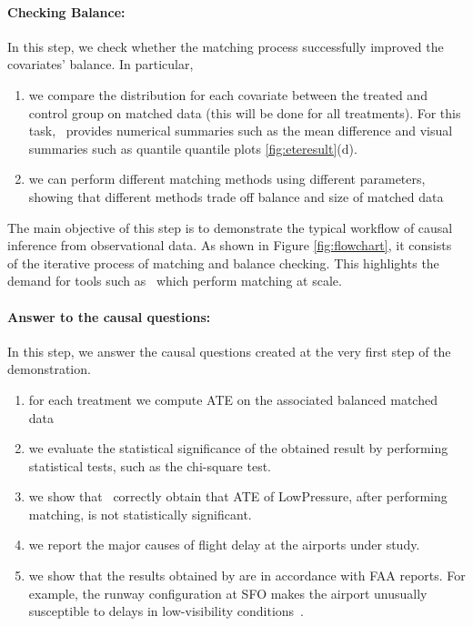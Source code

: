 \paragraph{\bf Checking Balance:}  In this step, we check whether the
matching process  successfully improved the covariates' balance. In particular,
    \begin{enumerate}
      \item  we compare the distribution for each covariate between the treated and control group on matched data (this will be done for all treatments). For this task, \GSQL\  provides numerical summaries such as the mean difference and visual summaries such as quantile quantile plots \ref{fig:eteresult}(d).

      \item  we can perform different matching methods using different
        parameters, showing that different methods trade off balance and size of matched data%
       \end{enumerate}
      The main objective of this step is to demonstrate the typical workflow of causal inference from observational data. As shown in Figure \ref{fig:flowchart}, it consists of the iterative process of matching and balance checking. This highlights the demand for tools such as \GSQL\, which perform matching at scale.

     \paragraph{\bf Answer to the causal questions:} %
In this step,  we answer the causal questions created at the very first step of the demonstration.
       \begin{enumerate}
       \item for each treatment we compute ATE on the associated balanced matched data
      \item we evaluate the statistical significance of the obtained
        result by performing statistical tests, such as the chi-square test.
      \item we show that \GSQL\ correctly obtain that ATE of
        LowPressure, after performing matching, is not statistically significant.
        \item we report the major causes of flight delay at the airports under study.
    \item   we show that the results obtained by \GSQL are in accordance with
FAA reports. %
For example, the runway configuration at SFO makes the airport
unusually susceptible to delays in low-visibility conditions~\cite{faa-sfo}.

        \end{enumerate}



